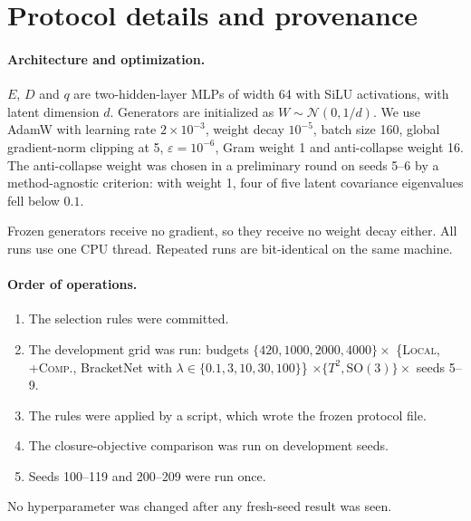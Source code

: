 

\section{Protocol details and provenance}\label{app:protocol}
\paragraph{Architecture and optimization.}
$E$, $D$ and $q$ are two-hidden-layer MLPs of width 64 with SiLU activations, with latent dimension $d$.
Generators are initialized as $W\sim\mathcal N(0,1/d)$. We use AdamW with learning rate $2\times10^{-3}$, weight
decay $10^{-5}$, batch size 160, global gradient-norm clipping at 5, $\varepsilon=10^{-6}$, Gram weight 1 and
anti-collapse weight 16. The anti-collapse weight was chosen in a preliminary round on seeds 5--6 by a
method-agnostic criterion: with weight 1, four of five latent covariance eigenvalues fell below $0.1$.

Frozen generators receive no gradient, so they receive no weight decay either. All runs use one CPU thread. Repeated
runs are bit-identical on the same machine.

\paragraph{Order of operations.}
\begin{enumerate}
\item The selection rules were committed.
\item The development grid was run: budgets $\{420,1000,2000,4000\}\times$ \{\textsc{Local}, \textsc{+Comp.},
BracketNet with $\lambda\in\{0.1,3,10,30,100\}$\} $\times\{T^2,\mathrm{SO(3)}\}\times$ seeds 5--9.
\item The rules were applied by a script, which wrote the frozen protocol file.
\item The closure-objective comparison was run on development seeds.
\item Seeds 100--119 and 200--209 were run once.
\end{enumerate}
No hyperparameter was changed after any fresh-seed result was seen.


